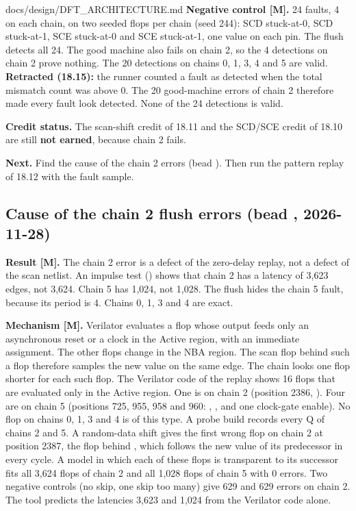 \begin{relocated}{docs/design/DFT_ARCHITECTURE.md}
\textbf{Negative control {[}M{]}.} 24 faults, 4 on each chain, on two
seeded flops per chain (seed 244): SCD stuck-at-0, SCD stuck-at-1, SCE
stuck-at-0 and SCE stuck-at-1, one value on each pin. The flush detects
all 24. The good machine also fails on chain 2, so the 4 detections on
chain 2 prove nothing. The 20 detections on chains 0, 1, 3, 4 and 5 are
valid. \textbf{Retracted (18.15):} the runner counted a fault as
detected when the total mismatch count was above 0. The 20 good-machine
errors of chain 2 therefore made every fault look detected. None of the
24 detections is valid.

\textbf{Credit status.} The scan-shift credit of 18.11 and the SCD/SCE
credit of 18.10 are still \textbf{not earned}, because chain 2 fails.

\textbf{Next.} Find the cause of the chain 2 errors (bead
). Then run the pattern replay of 18.12 with the fault
sample.

\subsection{Cause of the chain 2 flush errors (bead ,
2026-11-28)}\label{tm:ch:dft-architecture:1814-chain2-cause}

\textbf{Result {[}M{]}.} The chain 2 error is a defect of the zero-delay
replay, not a defect of the scan netlist. An impulse test
() shows that chain 2 has a latency of 3,623
edges, not 3,624. Chain 5 has 1,024, not 1,028. The  flush
hides the chain 5 fault, because its period is 4. Chains 0, 1, 3 and 4
are exact.

\textbf{Mechanism {[}M{]}.} Verilator evaluates a flop whose output feeds
only an asynchronous reset or a clock in the Active region, with an
immediate assignment. The other flops change in the NBA region. The scan
flop behind such a flop therefore samples the new value on the same
edge. The chain looks one flop shorter for each such flop. The Verilator
code of the replay shows 16 flops that are evaluated only in the Active
region. One is on chain 2 (position 2386, ). Four are
on chain 5 (positions 725, 955, 958 and 960: ,
, 
and one clock-gate enable). No flop on chains 0, 1, 3 and 4 is of this
type. A probe build records every Q of chains 2 and 5. A random-data
shift gives the first wrong flop on chain 2 at position 2387, the flop
behind , which follows the new value of its
predecessor in every cycle. A model in which each of these flops is
transparent to its successor fits all 3,624 flops of chain 2 and all
1,028 flops of chain 5 with 0 errors. Two negative controls (no skip, one
skip too many) give 629 and 629 errors on chain 2. The tool
 predicts the latencies 3,623 and
1,024 from the Verilator code alone.


\end{relocated}
